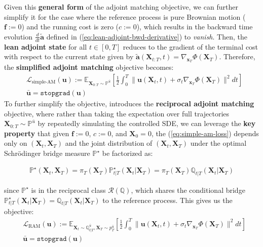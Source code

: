 \documentclass{article}
\newcommand{\boldtext}[1]{\textbf{\textcolor{MyGreen}{#1}}}
\begin{document}
Given this \textbf{general form} of the adjoint matching objective, we can further simplify it for the case where the reference process is pure Brownian motion ($\boldsymbol{f}:=0$) and the running cost is zero ($c:=0$), which results in the backward time evolution $\frac{d}{dt}\tilde{\boldsymbol{a}}$ defined in (\ref{eq:lean-adjoint-bwd-derivative}) to \textit{vanish}. Then, the \textbf{lean adjoint state} for all $t\in [0,T]$ reduces to the gradient of the terminal cost with respect to the current state given by $\tilde{\boldsymbol{a}}(\boldsymbol{X}_{t:T}, t)=\nabla_{\boldsymbol{x}_T}\Phi(\boldsymbol{X}_T)$. Therefore, the \boldtext{simplified adjoint matching} objective becomes:
\begin{align}
    &\mathcal{L}_{\text{simple-AM}}(\boldsymbol{u}):=\mathbb{E}_{\boldsymbol{X}_{0:T}\sim \mathbb{P}^{\bar{u}}}\left[\frac{1}{2}\int_0^T\|\boldsymbol{u}(\boldsymbol{X}_t,t)+\sigma_t\nabla_{\boldsymbol{x}_T}\Phi(\boldsymbol{X}_T)\|^2dt\right]\tag{Simplified AM Objective}\label{eq:simple-am-loss}\\
    &\bar{\boldsymbol{u}}=\texttt{stopgrad}(\boldsymbol{u})\nonumber
\end{align}
To further simplify the objective, \citet{havens2025adjoint} introduces the \boldtext{reciprocal adjoint matching} objective, where rather than taking the expectation over full trajectories $\boldsymbol{X}_{0:T}\sim \mathbb{P}^{\bar{u}}$ by repeatedly simulating the controlled SDE, we can leverage the \textbf{key property} that given $\boldsymbol{f}:=0$, $c:=0$, and $\boldsymbol{X}_0=0$, the (\ref{eq:simple-am-loss}) depends only on $(\boldsymbol{X}_t,\boldsymbol{X}_T)$ and the joint distribution of $(\boldsymbol{X}_t,\boldsymbol{X}_T)$ under the optimal Schrödinger bridge measure $\mathbb{P}^\star$ be factorized as:
\begin{small}
\begin{align}
    \mathbb{P}^\star(\boldsymbol{X}_t, \boldsymbol{X}_T)=\pi_T(\boldsymbol{X}_T)\mathbb{P}_{t|T}^\star(\boldsymbol{X}_t|\boldsymbol{X}_T)=\pi_T(\boldsymbol{X}_T)\mathbb{Q}_{t|T}(\boldsymbol{X}_t|\boldsymbol{X}_T)
\end{align}
\end{small}
since $\mathbb{P}^\star$ is in the reciprocal class $\mathcal{R}(\mathbb{Q})$, which shares the conditional bridge  $\mathbb{P}_{t|T}^\star(\boldsymbol{X}_t|\boldsymbol{X}_T)=\mathbb{Q}_{t|T}(\boldsymbol{X}_t|\boldsymbol{X}_T)$ to the reference process. This gives us the objective:
\begin{align}
    &\mathcal{L}_{\text{RAM}}(\boldsymbol{u}):=\mathbb{E}_{\boldsymbol{X}_t\sim \mathbb{Q}_{t|T}^{\bar{u}}, \boldsymbol{X}_T\sim p^{\bar{u}}_T}\left[\frac{1}{2}\int_0^T\|\boldsymbol{u}(\boldsymbol{X}_t,t)+\sigma_t\nabla_{\boldsymbol{x}_T}\Phi(\boldsymbol{X}_T)\|^2dt\right]\tag{Reciprocal AM Loss}\label{eq:reciprocal-am-loss}\\
    &\bar{\boldsymbol{u}}=\texttt{stopgrad}(\boldsymbol{u})\nonumber
\end{align}
\end{document}
